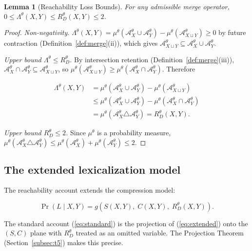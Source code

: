 \documentclass[12pt]{article}
\theoremstyle{rthm}
\newtheorem{lemma}[theorem]{Lemma}
\theoremstyle{rdef}
\theoremstyle{remark}
\newcommand{\A}{\mathcal{A}}
\newcommand{\RD}[1][\theta]{R_{D}^{#1}}
\newcommand{\Lam}[1][\theta]{\Lambda^{#1}}
\begin{document}
\begin{lemma}[Reachability Loss Bounds]
\label{lem:bounds}
For any admissible merge operator, $0 \leq \Lam(X,Y) \leq \RD(X,Y) \leq 2$.
\end{lemma}

\begin{proof}
\emph{Non-negativity.} $\Lam(X,Y) = \mu^{\theta}(\A_X^{\theta} \cup
\A_Y^{\theta}) - \mu^{\theta}(\A_{X \sqcup Y}^{\theta}) \geq 0$ by future
contraction (Definition~\ref{def:merge}(ii)), which gives $\A_{X \sqcup
Y}^{\theta} \subseteq \A_X^{\theta} \cup \A_Y^{\theta}$.

\emph{Upper bound $\Lam \leq \RD$.} By intersection retention
(Definition~\ref{def:merge}(iii)), $\A_X^{\theta} \cap \A_Y^{\theta} \subseteq
\A_{X \sqcup Y}^{\theta}$, so $\mu^{\theta}(\A_{X \sqcup Y}^{\theta}) \geq
\mu^{\theta}(\A_X^{\theta} \cap \A_Y^{\theta})$. Therefore

\begin{align*}
\Lam(X,Y)
&= \mu^{\theta}(\A_X^{\theta} \cup \A_Y^{\theta})
 - \mu^{\theta}(\A_{X \sqcup Y}^{\theta}) \\
&\leq \mu^{\theta}(\A_X^{\theta} \cup \A_Y^{\theta})
    - \mu^{\theta}(\A_X^{\theta} \cap \A_Y^{\theta}) \\
&= \mu^{\theta}(\A_X^{\theta} \triangle \A_Y^{\theta})
 = \RD(X,Y).
\end{align*}

\emph{Upper bound $\RD \leq 2$.} Since $\mu^{\theta}$ is a probability measure,
$\mu^{\theta}(\A_X^{\theta} \triangle \A_Y^{\theta}) \leq \mu^{\theta}(\A_X^{\theta})
+ \mu^{\theta}(\A_Y^{\theta}) \leq 2$.
\end{proof}

\subsection{The extended lexicalization model}

The reachability account extends the compression model:

\begin{equation}
\label{eq:extended}
\Pr(L \mid X, Y) = g\!\left(S(X,Y),\; C(X,Y),\; \RD(X,Y)\right).
\end{equation}

The standard account (\ref{eq:standard}) is the projection of (\ref{eq:extended})
onto the $(S, C)$ plane with $\RD$ treated as an omitted variable. The Projection
Theorem (Section~\ref{subsec:t5}) makes this precise.
\end{document}
